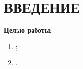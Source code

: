\section*{ВВЕДЕНИЕ}



\textbf{Целью работы}:



\begin{enumerate}[label=\arabic*)]
	\item ;
	\item .
\end{enumerate}